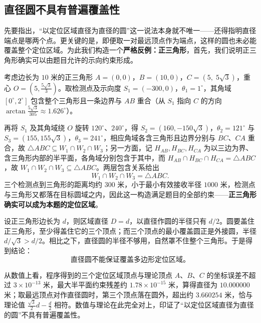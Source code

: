 \documentclass[withoutpreface]{cumcmthesis}
\begin{document}
\subsection{直径圆不具有普遍覆盖性}

先要指出，“以定位区域直径为直径的圆”这一说法本身就不唯一——还得指明直径端点是哪两个点。更关键的是，即便取一对最远顶点作为端点，这样的圆也未必能覆盖整个定位区域。为此我们构造一个\textbf{严格反例：正三角形}，首先，我们说明正三角形确实可以由题目允许的示向约束形成。

考虑边长为 $10$ 米的正三角形 $A=(0,0)$，$B=(10,0)$，$C=(5,\;5\sqrt{3})$，重心 $O=(5,\frac{5\sqrt{3}}{3})$。取检测点及示向度 $S_1=(-300,0)$，$\theta_1=1^\circ$，其角域 $[0^\circ,2^\circ]$ 包含整个三角形且一条边界与 $AB$ 重合（从 $S_1$ 指向 $C$ 的方向 $\arctan\frac{5\sqrt3}{305}\approx1.626^\circ$）。

再将 $S_1$ 及其角域绕 $O$ 旋转 $120^\circ$、$240^\circ$，得 $S_2=(160,-150\sqrt{3})$，$\theta_2=121^\circ$ 与 $S_3=(155,155\sqrt{3})$，$\theta_3=241^\circ$，相应角域各含三角形且边界分别与 $BC$、$CA$ 重合，故 $\triangle ABC\subseteq W_1\cap W_2\cap W_3$；另一方面，记 $H_{AB},H_{BC},H_{CA}$ 为以三边为界、含三角形内部的半平面，各角域分别包含于其中，而 $H_{AB}\cap H_{BC}\cap H_{CA}=\triangle ABC$，故 $W_1\cap W_2\cap W_3\subseteq\triangle ABC$。两层包含关系给出
\begin{equation}\label{eq:triangle_region}
W_1\cap W_2\cap W_3=\triangle ABC.
\end{equation}
三个检测点到三角形的距离均约 $300$ 米，小于最小有效接收半径 $1000$ 米，检测点与三角形又都落在目标圆域之内，因此这一构造满足题目的全部约束——\textbf{正三角形确实可以成为本题的定位区域}。

设正三角形边长为 $d$，则区域直径 $D=d$，以直径作圆的半径只有 $d/2$。圆要盖住正三角形，至少得盖住它的三个顶点；而三个顶点的最小覆盖圆正是外接圆，半径 $d/\sqrt{3}>d/2$。相比之下，直径圆的半径不够用，自然罩不住整个三角形。于是得到结论：
\begin{equation}\label{eq:coverage_conclusion}
\boxed{\text{直径圆不能保证覆盖多边形定位区域。}}
\end{equation}

从数值上看，程序得到的三个定位区域顶点与理论顶点 $A$、$B$、$C$ 的坐标误差不超过 $3\times10^{-13}$ 米，最大半平面约束残差约 $1.78\times10^{-15}$ 米，算得直径为 $10.000000$ 米；取最远顶点对作直径圆时，第三个顶点落在圆外，超出约 $3.660254$ 米，恰与理论值 $\frac{\sqrt{3}}{2}d-\frac{d}{2}$ 相符。数值与理论在此完全对上，印证了“以定位区域直径为直径的圆”不具有普遍覆盖性。
\end{document}
